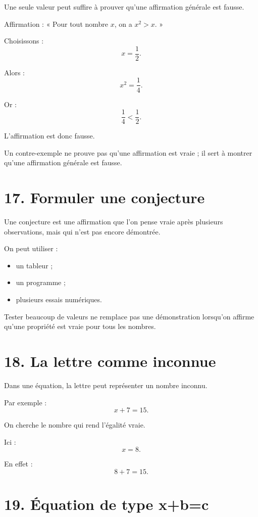 Une seule valeur peut suffire à prouver qu'une affirmation générale est fausse.

\begin{exemple}
Affirmation : « Pour tout nombre $x$, on a $x^2>x$. »

Choisissons :
\[
x=\dfrac12.
\]

Alors :
\[
x^2=\dfrac14.
\]

Or :
\[
\dfrac14<\dfrac12.
\]

L'affirmation est donc fausse.
\end{exemple}

\begin{remarque}
Un contre-exemple ne prouve pas qu'une affirmation est vraie ; il sert à montrer qu'une affirmation générale est fausse.
\end{remarque}

\section{17. Formuler une conjecture}

Une conjecture est une affirmation que l'on pense vraie après plusieurs observations, mais qui n'est pas encore démontrée.

On peut utiliser :
\begin{itemize}
\item un tableur ;
\item un programme ;
\item plusieurs essais numériques.
\end{itemize}

\begin{attention}
Tester beaucoup de valeurs ne remplace pas une démonstration lorsqu'on affirme qu'une propriété est vraie pour tous les nombres.
\end{attention}

\section{18. La lettre comme inconnue}

Dans une équation, la lettre peut représenter un nombre inconnu.

Par exemple :
\[
x+7=15.
\]

On cherche le nombre qui rend l'égalité vraie.

Ici :
\[
x=8.
\]

En effet :
\[
8+7=15.
\]

\section{19. Équation de type x+b=c}

